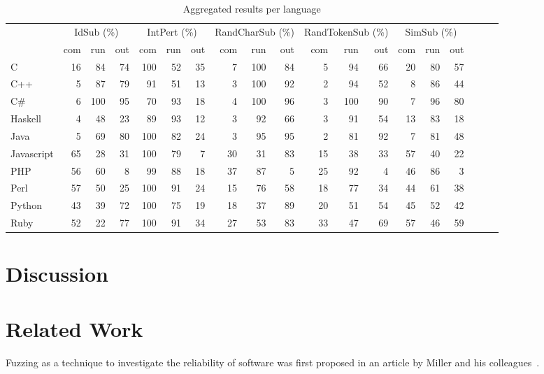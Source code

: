 \documentclass[10pt]{sigplanconf}
\begin{document}
\begin{table*}
\begin{center}
\caption{Aggregated results per language}
\label{tbl:aggregated-per-language}
\begin{tabular}{ l r r r r r r r r r r r r r r r r r r }
 \hline
 & \multicolumn{3}{c}{IdSub (\%)} & \multicolumn{3}{c}{IntPert (\%)} & \multicolumn{3}{c}{RandCharSub (\%)} & \multicolumn{3}{c}{RandTokenSub (\%)} & \multicolumn{3}{c}{SimSub (\%)}\\
 & com & run & out & com & run & out & com & run & out & com & run & out & com & run & out\\
\hline
C & 16 & 84 & 74 & 100 & 52 & 35 & 7 & 100 & 84 & 5 & 94 & 66 & 20 & 80 & 57 \\
C++ & 5 & 87 & 79 & 91 & 51 & 13 & 3 & 100 & 92 & 2 & 94 & 52 & 8 & 86 & 44 \\
C\# & 6 & 100 & 95 & 70 & 93 & 18 & 4 & 100 & 96 & 3 & 100 & 90 & 7 & 96 & 80 \\
Haskell & 4 & 48 & 23 & 89 & 93 & 12 & 3 & 92 & 66 & 3 & 91 & 54 & 13 & 83 & 18 \\
Java & 5 & 69 & 80 & 100 & 82 & 24 & 3 & 95 & 95 & 2 & 81 & 92 & 7 & 81 & 48 \\
Javascript & 65 & 28 & 31 & 100 & 79 & 7 & 30 & 31 & 83 & 15 & 38 & 33 & 57 & 40 & 22 \\
PHP & 56 & 60 & 8 & 99 & 88 & 18 & 37 & 87 & 5 & 25 & 92 & 4 & 46 & 86 & 3 \\
Perl & 57 & 50 & 25 & 100 & 91 & 24 & 15 & 76 & 58 & 18 & 77 & 34 & 44 & 61 & 38 \\
Python & 43 & 39 & 72 & 100 & 75 & 19 & 18 & 37 & 89 & 20 & 51 & 54 & 45 & 52 & 42 \\
Ruby & 52 & 22 & 77 & 100 & 91 & 34 & 27 & 53 & 83 & 33 & 47 & 69 & 57 & 46 & 59 \\
\hline
\end{tabular}
\end{center}
\end{table*}

\section{Discussion} %
\label{sec:discussion}

\section{Related Work} %
\label{sec:related}

Fuzzing as a technique to investigate the reliability of software
was first proposed in an article by Miller and his colleagues~\cite{MFS90}.
\end{document}
